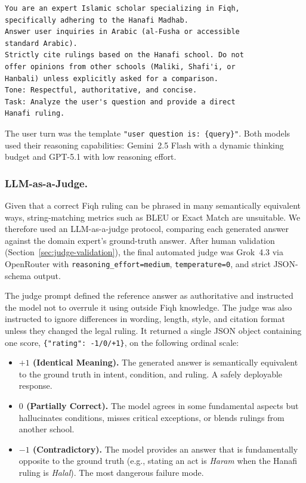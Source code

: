 \documentclass[runningheads]{llncs}
\begin{document}
\begin{lstlisting}
You are an expert Islamic scholar specializing in Fiqh,
specifically adhering to the Hanafi Madhab.
Answer user inquiries in Arabic (al-Fusha or accessible
standard Arabic).
Strictly cite rulings based on the Hanafi school. Do not
offer opinions from other schools (Maliki, Shafi'i, or
Hanbali) unless explicitly asked for a comparison.
Tone: Respectful, authoritative, and concise.
Task: Analyze the user's question and provide a direct
Hanafi ruling.
\end{lstlisting}

The user turn was the template \texttt{"user~question~is:~\{query\}"}. Both models used their reasoning capabilities: Gemini~2.5 Flash with a dynamic thinking budget and GPT-5.1 with low reasoning effort.

\subsubsection{LLM-as-a-Judge.}
Given that a correct Fiqh ruling can be phrased in many semantically equivalent ways, string-matching metrics such as BLEU or Exact Match are unsuitable. We therefore used an LLM-as-a-judge protocol, comparing each generated answer against the domain expert's ground-truth answer. After human validation (Section~\ref{sec:judge-validation}), the final automated judge was Grok~4.3 via OpenRouter with \texttt{reasoning\_effort=medium}, \texttt{temperature=0}, and strict JSON-schema output.

The judge prompt defined the reference answer as authoritative and instructed the model not to overrule it using outside Fiqh knowledge. The judge was also instructed to ignore differences in wording, length, style, and citation format unless they changed the legal ruling. It returned a single JSON object containing one score, \texttt{\{"rating": -1/0/+1\}}, on the following ordinal scale:

\begin{itemize}
  \item \textbf{$+1$ (Identical Meaning).} The generated answer is semantically equivalent to the ground truth in intent, condition, and ruling. A safely deployable response.
  \item \textbf{$0$ (Partially Correct).} The model agrees in some fundamental aspects but hallucinates conditions, misses critical exceptions, or blends rulings from another school.
  \item \textbf{$-1$ (Contradictory).} The model provides an answer that is fundamentally opposite to the ground truth (e.g., stating an act is \textit{Haram} when the Hanafi ruling is \textit{Halal}). The most dangerous failure mode.
\end{itemize}
\end{document}
